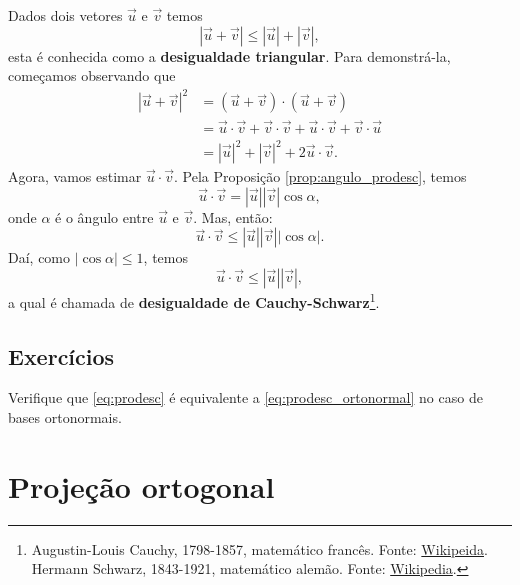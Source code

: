 Dados dois vetores $\vec{u}$ e $\vec{v}$ temos
\begin{equation}
  |\vec{u}+\vec{v}| \leq |\vec{u}| + |\vec{v}|,
\end{equation}
esta é conhecida como a {\bf desigualdade triangular}. Para demonstrá-la, começamos observando que
\begin{align}
  |\vec{u}+\vec{v}|^2 &= (\vec{u}+\vec{v})\cdot(\vec{u}+\vec{v})\\
                      &= \vec{u}\cdot\vec{v}+\vec{v}\cdot\vec{v}+\vec{u}\cdot\vec{v}+\vec{v}\cdot\vec{u}\\
                      &= |\vec{u}|^2 + |\vec{v}|^2 + 2\vec{u}\cdot\vec{v}.  
\end{align}
Agora, vamos estimar $\vec{u}\cdot\vec{v}$. Pela Proposição \ref{prop:angulo_prodesc}, temos
\begin{equation}
  \vec{u}\cdot\vec{v} = |\vec{u}||\vec{v}|\cos\alpha,
\end{equation}
onde $\alpha$ é o ângulo entre $\vec{u}$ e $\vec{v}$. Mas, então:
\begin{equation}
  \vec{u}\cdot\vec{v} \leq |\vec{u}||\vec{v}||\cos\alpha|.
\end{equation}
Daí, como $|\cos\alpha|\leq 1$, temos
\begin{equation}
  \vec{u}\cdot\vec{v}\leq |\vec{u}||\vec{v}|,
\end{equation}
a qual é chamada de {\bf desigualdade de Cauchy-Schwarz}\footnote{Augustin-Louis Cauchy, 1798-1857, matemático francês. Fonte: \href{https://en.wikipedia.org/wiki/Augustin-Louis_Cauchy}{Wikipeida}. Hermann Schwarz, 1843-1921, matemático alemão. Fonte: \href{https://en.wikipedia.org/wiki/Hermann\_Schwarz}{Wikipedia}.}.


\subsection*{Exercícios}

\begin{exer}\label{exer:prodesc_orto}
  Verifique que \eqref{eq:prodesc} é equivalente a \eqref{eq:prodesc_ortonormal} no caso de bases ortonormais.
\end{exer}


\emconstrucao

\section{Projeção ortogonal}\label{cap_prodesc_sec_proj}

